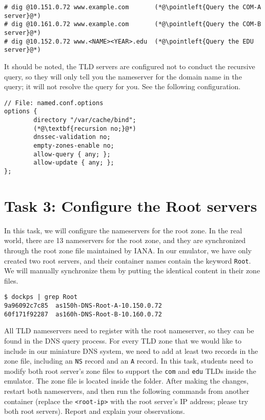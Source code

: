 \begin{lstlisting}
# dig @10.151.0.72 www.example.com       (*@\pointleft{Query the COM-A server}@*) 
# dig @10.161.0.72 www.example.com       (*@\pointleft{Query the COM-B server}@*) 
# dig @10.152.0.72 www.<NAME><YEAR>.edu  (*@\pointleft{Query the EDU server}@*) 
\end{lstlisting}



It should be noted, the TLD servers are configured
not to conduct the recursive query, so they will only tell you
the nameserver for the domain name in the query; it will not
resolve the query for you.  See the following configuration.

\begin{lstlisting}
// File: named.conf.options
options {
        directory "/var/cache/bind";
        (*@\textbf{recursion no;}@*)  
        dnssec-validation no;
        empty-zones-enable no;
        allow-query { any; };
        allow-update { any; };
};
\end{lstlisting}
 


\section{Task 3: Configure the Root servers}

In this task, we will configure the nameservers for the root zone. 
In the real world, there are 13 nameservers for the root zone,
and they are synchronized through the root zone file maintained by IANA. 
In our emulator, we have only created two root servers, 
and their container names contain the keyword \texttt{Root}. 
We will manually synchronize them by putting the identical content 
in their zone files. 

\begin{lstlisting}
$ dockps | grep Root
9a96092c7c85  as150h-DNS-Root-A-10.150.0.72
60f171f92287  as160h-DNS-Root-B-10.160.0.72
\end{lstlisting}
 

All TLD nameservers need to register
with the root nameserver, so they can be found
in the DNS query process.
For every TLD zone that we would like to include in our
miniature DNS system, we need to add at least two records
in the zone file, including an \texttt{NS} record
and an \texttt{A} record.  In this task, students need to
modify both root server's zone files to support the 
\texttt{com} and \texttt{edu} TLDs inside the emulator. 
The zone file is located inside the  folder.
After making the changes, restart both nameservers, 
and then run the following commands from another container (replace
the \texttt{<root-ip>} with the root server's IP address;
please try both root servers). 
Report and explain your observations. 

